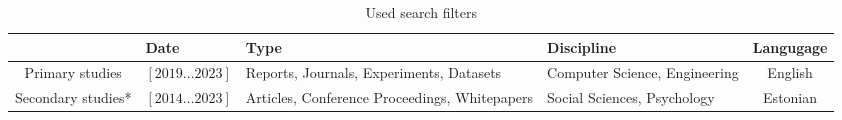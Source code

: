 \begin{table}[h]
\label{tab:filters1}
\centering
\small
\caption{Used search filters}
\begin{tabularx}{\textwidth}{|c|Y|Y|Y|c|}
\hline
\textbf{}          & \textbf{Date}     & \textbf{Type}                                 & \textbf{Discipline}           & \textbf{Langugage} \\\hline
Primary studies    & $[2019\dots2023]$ & Reports, Journals, Experiments, Datasets      & Computer Science, Engineering     & English            \\\hline
Secondary studies* & $[2014\dots2023]$ & Articles, Conference Proceedings, Whitepapers & Social Sciences, Psychology & Estonian \\\hline
\end{tabularx}
\end{table}



